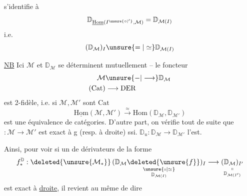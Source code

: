 s'identifie à
\[
\mathbb D_{\underline{\mathrm{Hom}}(I^{\unsure{\circ|'}},\mathcal M)}=\mathbb D_{\mathcal M(I)}
\]
i.e.
\[
(\mathbb D_{\mathcal M})_I\unsure{=|\simeq}\mathbb D_{\mathcal M(I)}
\]


\uline{NB} Ici $\mathcal M$ et $\mathbb D_{\mathcal M}$ se déterminent mutuellement -- le foncteur
\[
\begin{aligned}
\mathcal M&\unsure{\mathord{-}|\longrightarrow}\mathbb D_{\mathcal M}\\
(\mathrm{Cat})&\longrightarrow\mathrm{DER}
\end{aligned}
\]
est 2-fidèle, i.e. si $\mathcal M,\mathcal M'$ sont  $\mathrm{Cat}$
\[
\underline{\mathrm{Hom}}(\mathcal M,\mathcal M')\xrightarrow{\approx}\mathrm{Hom}(\mathbb D_{\mathcal M},\mathbb D_{\mathcal M'})
\]
est une équivalence de catégories. D'autre part, on vérifie tout de suite que   $:\mathcal M\longrightarrow\mathcal M'$ est exact à g (resp. à droite) ssi. $\mathbb D_u:\mathbb D_{\mathcal M}\longrightarrow\mathbb D_{\mathcal M'}$ l'est.

Ainsi, pour voir si un   de dérivateurs de la forme
\[
f^{\mathbb D}_*:\deleted{\unsure{\mathcal M_*}}\,
\underset{\substack{\unsure{\shortparallel|\simeq}\\\mathbb D_{\mathcal M(I)}}}{(\mathbb D_{\mathcal M}\deleted{\unsure{f}})_I}
\longrightarrow
\underset{\substack{\shortparallel\\\mathbb D_{\mathcal M(I')}}}{(\mathbb D_{\mathcal M})_{I'}}
\]
est exact à \uline{droite}, il revient au même de dire
